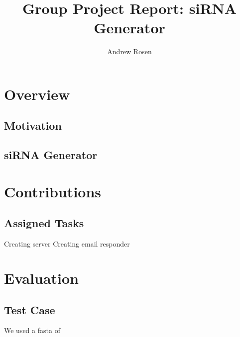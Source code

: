 \documentclass[10pt,letterpaper]{article}
\author{Andrew Rosen}
\title{Group Project Report: siRNA Generator}
\date{}
\begin{document}
\maketitle

\section{Overview}


\subsection{Motivation}

\subsection{siRNA  Generator}


\section{Contributions}



\subsection{Assigned Tasks}
Creating server
Creating email responder




\section{Evaluation}


\subsection{Test Case}
We used a fasta of 



\end{document}
